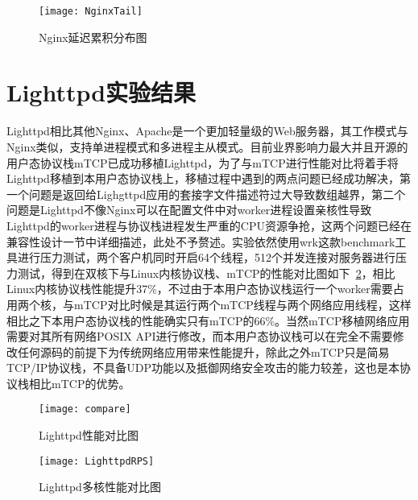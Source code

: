 \vspace{-10pt}
\begin{figure}[H] %
  \centering
  \texttt{[image: NginxTail]}
  \caption{Nginx延迟累积分布图}
  \label{fig:NginxTail}
\end{figure}
\vspace{-10pt}

\section{Lighttpd实验结果}
Lighttpd相比其他Nginx、Apache是一个更加轻量级的Web服务器，其工作模式与Nginx类似，支持单进程模式和多进程主从模式。目前业界影响力最大并且开源的用户态协议栈mTCP已成功移植Lighttpd，为了与mTCP进行性能对比将着手将Lighttpd移植到本用户态协议栈上，移植过程中遇到的两点问题已经成功解决，第一个问题是返回给Lighgttpd应用的套接字文件描述符过大导致数组越界，第二个问题是Lighttpd不像Nginx可以在配置文件中对worker进程设置亲核性导致Lighttpd的worker进程与协议栈进程发生严重的CPU资源争抢，这两个问题已经在兼容性设计一节中详细描述，此处不予赘述。实验依然使用wrk这款benchmark工具进行压力测试，两个客户机同时开启64个线程，512个并发连接对服务器进行压力测试，得到在双核下与Linux内核协议栈、mTCP的性能对比图如下~\ref{fig:compare}，相比Linux内核协议栈性能提升37\%，不过由于本用户态协议栈运行一个worker需要占用两个核，与mTCP对比时候是其运行两个mTCP线程与两个网络应用线程，这样相比之下本用户态协议栈的性能确实只有mTCP的66\%。当然mTCP移植网络应用需要对其所有网络POSIX API进行修改，而本用户态协议栈可以在完全不需要修改任何源码的前提下为传统网络应用带来性能提升，除此之外mTCP只是简易TCP/IP协议栈，不具备UDP功能以及抵御网络安全攻击的能力较差，这也是本协议栈相比mTCP的优势。

\vspace{-10pt}
\begin{figure}[H] %
  \centering
  \texttt{[image: compare]}
  \caption{Lighttpd性能对比图}
  \label{fig:compare}
\end{figure}
\vspace{-10pt}

\vspace{-10pt}
\begin{figure}[H] %
  \centering
  \texttt{[image: LighttpdRPS]}
  \caption{Lighttpd多核性能对比图}
  \label{fig:LighttpdRPS}
\end{figure}
\vspace{-10pt}

